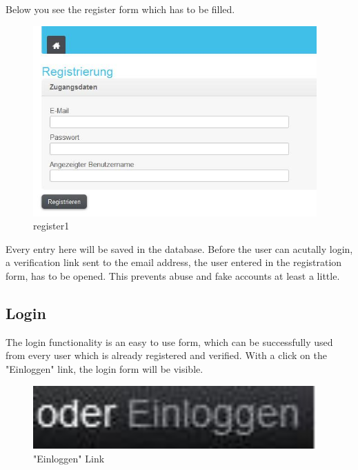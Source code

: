 Below you see the register form which has to be filled.

\begin{figure}[!ht]
  \centering
    \includegraphics[width=0.97\textwidth]{images/basic_functionalities/register_form.jpg}
  \caption{register1}
  \label{fig:register1}
\end{figure}

Every entry here will be saved in the database. Before the user can acutally login, a verification link sent to the email address, the user entered in the registration form, has to be opened. This prevents abuse and fake accounts at least a little.

\subsection{Login}

The login functionality is an easy to use form, which can be successfully used from every user which is already 
registered and verified. With a click on the "Einloggen" link, the login form will be visible.

\begin{figure}[!ht]
  \centering
    \includegraphics[width=0.97\textwidth]{images/basic_functionalities/oderEinloggen.jpg}
  \caption{"Einloggen" Link}
  \label{fig:einloggen}
\end{figure}

